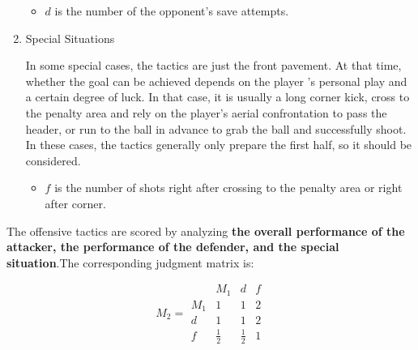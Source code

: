 \documentclass{mcmthesis}
\begin{document}
\begin{enumerate}
	\begin{itemize}
		\item $d$ is the number of the opponent's save attempts.
	\end{itemize}

	\item Special Situations
	
	\qquad In some special cases, the tactics are just the front pavement. At that time, whether the goal can be achieved depends on the player ’s personal play and a certain degree of luck. In that case, it is usually a long corner kick, cross to the penalty area and rely on the player's aerial confrontation to pass the header, or run to the ball in advance to grab the ball and successfully shoot. In these cases, the tactics generally only prepare the first half, so it should be considered.

	\begin{itemize}
		\item $f$ is the number of shots right after crossing to the penalty area or right after corner.
	\end{itemize}

	\end{enumerate}
	
	The offensive tactics are scored by analyzing \textbf{the overall performance of the attacker, the performance of the defender, and the special situation}.The corresponding judgment matrix is:

	\begin{equation}\label{mat:2}
		M_{2}=
	  \begin{matrix}
		& M_{1} & d &f\\
   		M_{1} & 1 & 1 & 2 \\
   		d & 1 & 1 & 2 \\
   		f & \frac{1}{2} & \frac{1}{2} & 1
  	\end{matrix}
	\end{equation}
	
\end{document}
